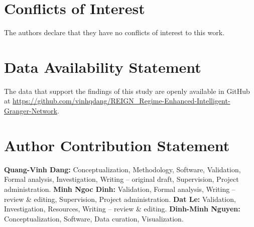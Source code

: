 \documentclass{BVP_JDSIS}
\begin{document}
\section*{Conflicts of Interest}
The authors declare that they have no conflicts of interest to this work.

\section*{Data Availability Statement}
The data that support the findings of this study are openly available in GitHub at \url{https://github.com/vinhqdang/REIGN_Regime-Enhanced-Intelligent-Granger-Network}.

\section*{Author Contribution Statement}
\textbf{Quang-Vinh Dang:} Conceptualization, Methodology, Software, Validation, Formal analysis, Investigation, Writing -- original draft, Supervision, Project administration. \textbf{Minh Ngoc Dinh:} Validation, Formal analysis, Writing -- review \& editing, Supervision, Project administration. \textbf{Dat Le:} Validation, Investigation, Resources, Writing -- review \& editing. \textbf{Dinh-Minh Nguyen:} Conceptualization, Software, Data curation, Visualization.


\end{document}
